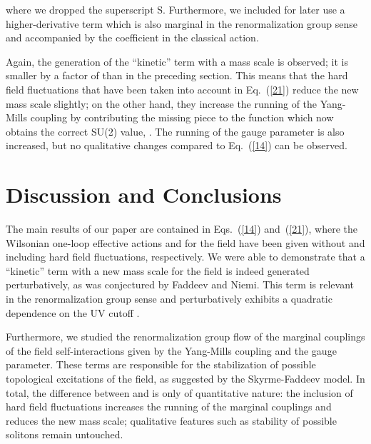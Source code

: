 \documentclass[a4paper,12pt]{article}
\providecommand{\re}[1]{~(\ref{#1})}\usepackage{useful_macros}
\begin{document}
where we dropped the superscript S. Furthermore, we included for later
use a higher-derivative term \myHighlight{$\sim\partial^2\mn\cdot\partial^2\mn$}\coordHE{}
which is also marginal in the renormalization group sense and
accompanied by the \coordHE{} coefficient in the classical action.

Again, the generation of the ``kinetic'' term \coordHE{}
with a mass scale is observed; it is smaller by a factor of \coordHE{} 
than in the preceding section. This means that the hard \myHighlight{$\mn$}\coordHE{} field
fluctuations that have been taken into account in Eq.\re{21} reduce
the new mass scale slightly; on the other hand, they increase the
running of the Yang-Mills coupling by contributing the missing piece
to the \myHighlight{$\beta$}\coordHE{} function which now obtains the correct SU(2) value,
\coordHE{}. The
running of the gauge parameter \myHighlight{$\alpha$}\coordHE{} is also increased, but no
qualitative changes compared to Eq.\re{14} can be observed. 


\section{Discussion and Conclusions}
The main results of our paper are contained in Eqs.\re{14} and\re{21},
where the Wilsonian one-loop effective actions \coordHE{} and
\coordHE{} for the \myHighlight{$\mn$}\coordHE{} field have been given without and including
hard \myHighlight{$\mn$}\coordHE{} field fluctuations, respectively. We were able to
demonstrate that a ``kinetic'' term with a new mass scale for the
\myHighlight{$\mn$}\coordHE{} field is indeed generated perturbatively, as was conjectured by
Faddeev and Niemi. This term is relevant in the renormalization group
sense and perturbatively exhibits a quadratic dependence on the UV
cutoff \myHighlight{$\Lambda$}\coordHE{}.

Furthermore, we studied the renormalization group flow of the marginal
couplings of the \myHighlight{$\mn$}\coordHE{} field self-interactions given by the Yang-Mills
coupling and the gauge parameter. These terms are responsible for the
stabilization of possible topological excitations of the \myHighlight{$\mn$}\coordHE{} field,
as suggested by the Skyrme-Faddeev model. In total, the difference
between \coordHE{} and \coordHE{} is only of quantitative
nature: the inclusion of hard \myHighlight{$\mn$}\coordHE{} field fluctuations increases the
running of the marginal couplings and reduces the new mass scale;
qualitative features such as stability of possible solitons remain
untouched. 
\end{document}
